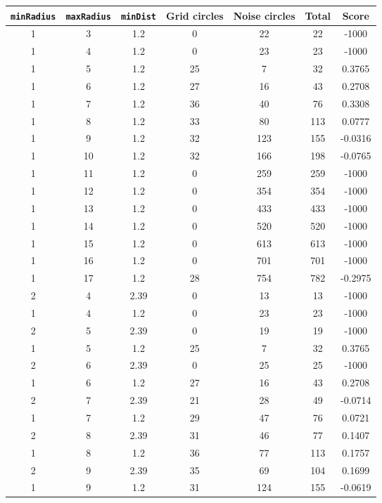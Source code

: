 \documentclass[letterpaper, 12pt]{article}
\begin{document}
\begin{longtable}{|c|c|c|c|c|c|c|}
\hline
\textbf{\texttt{minRadius}} & \textbf{\texttt{maxRadius}} & \textbf{\texttt{minDist}} & \textbf{Grid circles} & \textbf{Noise circles} & \textbf{Total} & \textbf{Score} \\
\hline
1 & 3 & 1.2 & 0 & 22 & 22 & -1000 \\
\hline
1 & 4 & 1.2 & 0 & 23 & 23 & -1000 \\
\hline
1 & 5 & 1.2 & 25 & 7 & 32 & 0.3765 \\
\hline
1 & 6 & 1.2 & 27 & 16 & 43 & 0.2708 \\
\hline
1 & 7 & 1.2 & 36 & 40 & 76 & 0.3308 \\
\hline
1 & 8 & 1.2 & 33 & 80 & 113 & 0.0777 \\
\hline
1 & 9 & 1.2 & 32 & 123 & 155 & -0.0316 \\
\hline
1 & 10 & 1.2 & 32 & 166 & 198 & -0.0765 \\
\hline
1 & 11 & 1.2 & 0 & 259 & 259 & -1000 \\
\hline
1 & 12 & 1.2 & 0 & 354 & 354 & -1000 \\
\hline
1 & 13 & 1.2 & 0 & 433 & 433 & -1000 \\
\hline
1 & 14 & 1.2 & 0 & 520 & 520 & -1000 \\
\hline
1 & 15 & 1.2 & 0 & 613 & 613 & -1000 \\
\hline
1 & 16 & 1.2 & 0 & 701 & 701 & -1000 \\
\hline
1 & 17 & 1.2 & 28 & 754 & 782 & -0.2975 \\
\hline
2 & 4 & 2.39 & 0 & 13 & 13 & -1000 \\
\hline
1 & 4 & 1.2 & 0 & 23 & 23 & -1000 \\
\hline
2 & 5 & 2.39 & 0 & 19 & 19 & -1000 \\
\hline
1 & 5 & 1.2 & 25 & 7 & 32 & 0.3765 \\
\hline
2 & 6 & 2.39 & 0 & 25 & 25 & -1000 \\
\hline
1 & 6 & 1.2 & 27 & 16 & 43 & 0.2708 \\
\hline
2 & 7 & 2.39 & 21 & 28 & 49 & -0.0714 \\
\hline
1 & 7 & 1.2 & 29 & 47 & 76 & 0.0721 \\
\hline
2 & 8 & 2.39 & 31 & 46 & 77 & 0.1407 \\
\hline
1 & 8 & 1.2 & 36 & 77 & 113 & 0.1757 \\
\hline
2 & 9 & 2.39 & 35 & 69 & 104 & 0.1699 \\
\hline
1 & 9 & 1.2 & 31 & 124 & 155 & -0.0619 \\

\end{longtable}
\end{document}
